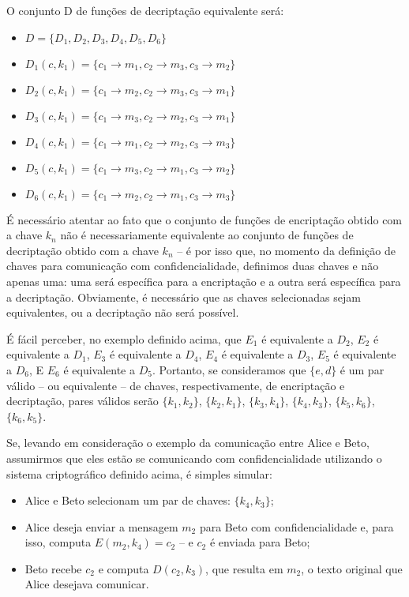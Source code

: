 \documentclass[
	10pt,				%
	openright,			%
	twoside,			%
	a5paper,			%
	english,			%
	french,				%
	spanish,			%
	brazil,				%
	sumario=tradicional
]{abntex2}
\begin{document}
O conjunto D de funções de decriptação equivalente será:

\begin{itemize}[noitemsep]
\item $D = \{ D_1, D_2, D_3, D_4, D_5, D_6 \}$
\item $D_1 (c, k_1) = \{ c_1 \to m_1, c_2 \to m_3, c_3 \to m_2 \}$
\item $D_2 (c, k_1) = \{ c_1 \to m_2, c_2 \to m_3, c_3 \to m_1 \}$
\item $D_3 (c, k_1) = \{ c_1 \to m_3, c_2 \to m_2, c_3 \to m_1 \}$
\item $D_4 (c, k_1) = \{ c_1 \to m_1, c_2 \to m_2, c_3 \to m_3 \}$
\item $D_5 (c, k_1) = \{ c_1 \to m_3, c_2 \to m_1, c_3 \to m_2 \}$
\item $D_6 (c, k_1) = \{ c_1 \to m_2, c_2 \to m_1, c_3 \to m_3 \}$
\end{itemize}

É necessário atentar ao fato que o conjunto de funções de encriptação obtido com a chave $k_n$ não é necessariamente equivalente ao conjunto de funções de decriptação obtido com a chave $k_n$ – é por isso que, no momento da definição de chaves para comunicação com confidencialidade, definimos duas chaves  e não apenas uma: uma será específica para a encriptação e a outra será específica para a decriptação. Obviamente, é necessário que as chaves selecionadas sejam equivalentes, ou a decriptação não será possível.

É fácil perceber, no exemplo definido acima, que $E_1$ é equivalente a $D_2$, $E_2$ é equivalente a $D_1$, $E_3$ é equivalente a $D_4$, $E_4$ é equivalente a $D_3$, $E_5$ é equivalente a $D_6$, E $E_6$ é equivalente a $D_5$. Portanto, se consideramos que $\{ e, d \}$ é um par válido – ou equivalente – de chaves, respectivamente, de encriptação e decriptação, pares válidos serão $\{ k_1, k_2 \}$, $\{ k_2, k_1 \}$, $\{ k_3, k_4 \}$, $\{ k_4, k_3 \}$, $\{ k_5, k_6 \}$, $\{ k_6, k_5 \}$.

Se, levando em consideração o exemplo da comunicação entre Alice e Beto, assumirmos que eles estão se comunicando com confidencialidade utilizando o sistema criptográfico definido acima, é simples simular:

\begin{itemize}[noitemsep]
\item Alice e Beto selecionam um par de chaves: $\{ k_4, k_3 \}$;
\item Alice deseja enviar a mensagem $m_2$ para Beto com confidencialidade e, para isso, computa $E(m_2, k_4) = c_2$ – e $c_2$ é enviada para Beto;
\item Beto recebe $c_2$ e computa $D(c_2, k_3)$, que resulta em $m_2$, o texto original que Alice desejava comunicar.
\end{itemize}
\end{document}

